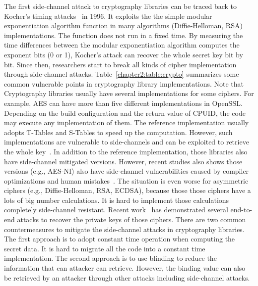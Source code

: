 The first side-channel attack to cryptography libraries can be traced back to Kocher's timing attacks~\cite{kocher1996timing} in 1996. It exploits the the simple modular exponentiation algorithm function in many algorithms (Diffie-Helloman, RSA) implementations. The function does not run in a fixed time. By measuring the time differences between the modular exponentiation algorithm computes the exponent bits (0 or 1), Kocher's attack can recover the whole secret key bit by bit. Since then, researchers start to break all kinds of cipher implementation through side-channel attacks.  Table~\ref{chapter2:table:crypto} summarizes some common vulnerable points in cryptography library implementations.  Note that Cryptography libraries usually have several implementations for some ciphers.
For example, AES can have more than five different implementations  in OpenSSL. Depending on the build configuration and the return value of \textsf{CPUID}, the code may execute any implementation of them. The reference implementation usually adopts T-Tables and S-Tables to speed up the computation. However, such implementations are vulnerable to side-channels and can be exploited to retrieve the whole key~\cite{bonneau2006cache}. In addition to the reference implementation, those libraries also have side-channel mitigated versions. However, recent studies also shows those versions (e.g., AES-NI) also have side-channel vulnerabilities caused by compiler optimizations and human mistakes~\cite{217537}. The situation is even worse for asymmetric ciphers (e.g., Diffie-Helloman, RSA, ECDSA), because those those ciphers have a lots of big number calculations. It is hard to implement those calculations completely side-channel resistant. Recent work~\cite{arnaud2013timing,yarom2017cachebleed,yarom2014flush+} has demonstrated several end-to-end attacks to recover the private keys of those ciphers. There are two common countermeasures to mitigate the side-channel attacks in cryptography libraries. The first approach is to adopt constant time operation when computing the secret data.  It is hard to migrate all the code into a constant time implementation. The second approach is to use blinding to reduce the information that can attacker can retrieve. However, the binding value can also be retrieved by an attacker through other attacks including side-channel attacks. 


